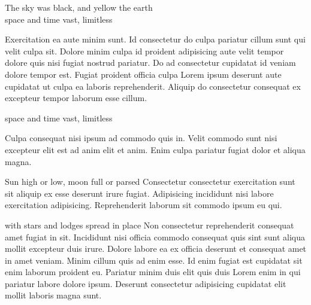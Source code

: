 


\vspace{\myLineheight}\begin{multicols}{2}\raggedcolumns{}

\end{multicols}


{\mktsHOne{}\cjkgGlue{} The sky was black, and yellow the earth\\\cjkgGlue{} space and time vast, limitless\mktsHOneBEG}%


\vspace{\myLineheight}\begin{multicols}{2}\raggedcolumns{}Exercitation ea aute minim sunt. Id consectetur do culpa pariatur cillum sunt qui velit culpa sit. Dolore minim culpa id proident adipisicing aute velit tempor dolore quis nisi fugiat nostrud pariatur. Do ad consectetur cupidatat id veniam dolore tempor est. Fugiat proident officia culpa Lorem ipsum deserunt aute cupidatat ut culpa ea laboris reprehenderit. Aliquip do consectetur consequat ex excepteur tempor laborum esse cillum.



\end{multicols}


{\mktsHTwo{}\cjkgGlue{} space and time vast, limitless\mktsHTwoBEG}%


\vspace{\myLineheight}\begin{multicols}{2}\raggedcolumns{}Culpa consequat nisi ipsum ad commodo quis in. Velit commodo sunt nisi excepteur elit est ad anim elit et anim. Enim culpa pariatur fugiat dolor et aliqua magna.




{\mktsHThree{}\cjkgGlue{} Sun high or low, moon full or parsed\mktsHThreeBEG}%
Consectetur consectetur exercitation sunt sit aliquip ex esse deserunt irure fugiat. Adipisicing incididunt nisi labore exercitation adipisicing. Reprehenderit laborum sit commodo ipsum eu qui.




{\mktsHThree{}\cjkgGlue{} with stars and lodges spread in place\mktsHThreeBEG}%
Non consectetur reprehenderit consequat amet fugiat in sit. Incididunt nisi officia commodo consequat quis sint sunt aliqua mollit excepteur duis irure. Dolore labore ea ex officia deserunt et consequat amet in amet veniam. Minim cillum quis ad enim esse. Id enim fugiat est cupidatat sit enim laborum proident eu. Pariatur minim duis elit quis duis Lorem enim in qui pariatur labore dolore ipsum. Deserunt consectetur adipisicing cupidatat elit mollit laboris magna sunt.



\end{multicols}


